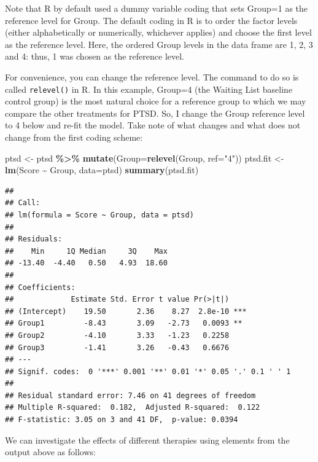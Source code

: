 \documentclass[
]{book}
\newenvironment{Shaded}{\begin{snugshade}}{\end{snugshade}}
\newcommand{\AttributeTok}[1]{\textcolor[rgb]{0.13,0.29,0.53}{#1}}
\newcommand{\FunctionTok}[1]{\textcolor[rgb]{0.13,0.29,0.53}{\textbf{#1}}}
\newcommand{\NormalTok}[1]{#1}
\newcommand{\OtherTok}[1]{\textcolor[rgb]{0.56,0.35,0.01}{#1}}
\newcommand{\SpecialCharTok}[1]{\textcolor[rgb]{0.81,0.36,0.00}{\textbf{#1}}}
\newcommand{\StringTok}[1]{\textcolor[rgb]{0.31,0.60,0.02}{#1}}
\begin{document}
Note that R by default used a dummy variable coding that sets Group=1 as the reference level for Group. The default coding in R is to order the factor levels (either alphabetically or numerically, whichever applies) and choose the first level as the reference level. Here, the ordered Group levels in the data frame are 1, 2, 3 and 4: thus, 1 was chosen as the reference level.

For convenience, you can change the reference level. The command to do so is called \texttt{relevel()} in R. In this example, Group=4 (the Waiting List baseline control group) is the most natural choice for a reference group to which we may compare the other treatments for PTSD. So, I change the Group reference level to 4 below and re-fit the model. Take note of what changes and what does not change from the first coding scheme:

\begin{Shaded}
\begin{Highlighting}[]
\NormalTok{ptsd }\OtherTok{\textless{}{-}}\NormalTok{ ptsd }\SpecialCharTok{\%\textgreater{}\%}
  \FunctionTok{mutate}\NormalTok{(}\AttributeTok{Group=}\FunctionTok{relevel}\NormalTok{(Group, }\AttributeTok{ref=}\StringTok{"4"}\NormalTok{))}
\NormalTok{ptsd.fit }\OtherTok{\textless{}{-}} \FunctionTok{lm}\NormalTok{(Score }\SpecialCharTok{\textasciitilde{}}\NormalTok{ Group, }\AttributeTok{data=}\NormalTok{ptsd)}
\FunctionTok{summary}\NormalTok{(ptsd.fit)}
\end{Highlighting}
\end{Shaded}

\begin{verbatim}
## 
## Call:
## lm(formula = Score ~ Group, data = ptsd)
## 
## Residuals:
##    Min     1Q Median     3Q    Max 
## -13.40  -4.40   0.50   4.93  18.60 
## 
## Coefficients:
##             Estimate Std. Error t value Pr(>|t|)    
## (Intercept)    19.50       2.36    8.27  2.8e-10 ***
## Group1         -8.43       3.09   -2.73   0.0093 ** 
## Group2         -4.10       3.33   -1.23   0.2258    
## Group3         -1.41       3.26   -0.43   0.6676    
## ---
## Signif. codes:  0 '***' 0.001 '**' 0.01 '*' 0.05 '.' 0.1 ' ' 1
## 
## Residual standard error: 7.46 on 41 degrees of freedom
## Multiple R-squared:  0.182,  Adjusted R-squared:  0.122 
## F-statistic: 3.05 on 3 and 41 DF,  p-value: 0.0394
\end{verbatim}

We can investigate the effects of different therapies using elements from the output above as follows:
\end{document}
